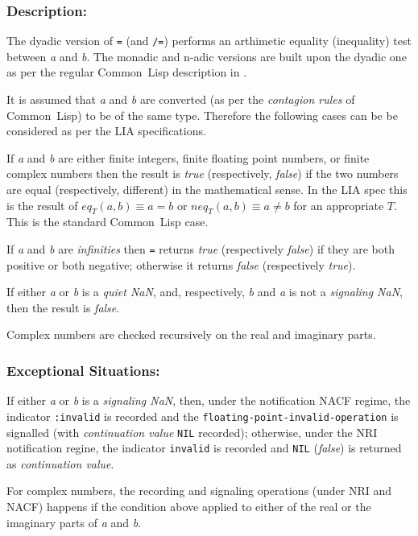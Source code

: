 \documentclass[10pt,fleqn]{article}
\newcommand{\CL}{\textsf{Common~Lisp}}
\newcommand{\code}[1]{\texttt{#1}}
\newcommand{\clieeeterm}[1]{\textit{#1}}
\newcommand{\varname}[1]{\textit{#1}}
\newcommand{\DDescription}{\subsubsection*{Description:}}
\newcommand{\DExceptional}{\subsubsection*{Exceptional Situations:}}
\begin{document}
\DDescription{}

The dyadic version of \code{=} (and \code{/=}) performs an arthimetic
equality (inequality) test between \varname{a} and \varname{b}.  The
monadic and n-adic versions are built upon the dyadic one as per the
regular \CL{} description in \cite{1996:ANSIHyperSpec}.

It is assumed that \varname{a} and \varname{b} are converted (as per
the \emph{contagion rules} of \CL{}) to be of the same type.
Therefore the following cases can be be considered as per the LIA
specifications.

\begin{description}
\item If \varname{a} and \varname{b} are either finite integers, finite
floating point numbers, or finite complex numbers then the result is
\varname{true} (respectively, \varname{false}) if the two numbers are
equal (respectively, different) in the mathematical sense.  In the
LIA spec this is the result of $\mathit{eq}_T(a, b) \equiv a = b$ or
$\mathit{neq}_T(a, b) \equiv a \neq b$ for an
appropriate $T$.  This is the standard \CL{} case.

\item If \varname {a} and \varname {b} are \clieeeterm{infinities} then
\code{=} returns \varname{true} (respectively \varname{false}) if they
are both positive or both negative; otherwise it returns
\varname{false} (respectively \varname{true}).

\item If either \varname {a} or \varname {b} is a \clieeeterm{quiet NaN},
and, respectively, \varname {b} and \varname {a} is not a
\clieeeterm{signaling NaN}, then the result is \varname{false}.

\item Complex numbers are checked recursively on the real and imaginary
parts.
\end{description}

\DExceptional{}

If either \varname {a} or \varname {b} is a \clieeeterm{signaling
  NaN}, then, under the notification NACF regime, the indicator
\code{:invalid} is recorded and the
\code{floating-point-invalid-operation} is signalled (with
\emph{continuation value} \code{NIL} recorded); otherwise, under the
NRI notification regine, the indicator \code{invalid} is recorded and
\code{NIL} (\varname{false}) is returned as \emph{continuation value}.

For complex numbers, the recording and signaling operations (under NRI
and NACF) happens if the condition above applied to either of the real
or the imaginary parts of \varname{a} and \varname{b}.
\end{document}

